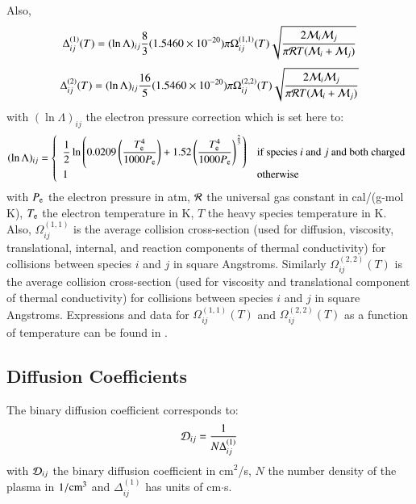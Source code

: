 \documentclass{warpdoc}
\newcommand{\mfd}{\displaystyle}
\begin{document}
Also,
%
\begin{equation}
    \Delta_{ij}^{(1)}(T)=(\ln \Lambda)_{ij}\frac{8}{3} (1.5460 \times 10^{-20}) \pi \Omega_{ij}^{(1,1)}(T) \sqrt{\frac{2 {\cal M}_i {\cal M}_j}{\pi {\cal R} T ({\cal M}_i + {\cal M}_j)} }
\end{equation}
%
%
\begin{equation}
    \Delta_{ij}^{(2)}(T)=(\ln \Lambda)_{ij} \frac{16}{5} (1.5460 \times 10^{-20}) \pi \Omega_{ij}^{(2,2)}(T) \sqrt{\frac{2 {\cal M}_i {\cal M}_j}{\pi {\cal R} T ({\cal M}_i + {\cal M}_j)} }
\end{equation}
%
with $(\ln \Lambda)_{ij}$ the electron pressure correction which is set here to:
%
\begin{equation}
  (\ln \Lambda)_{ij}=\left\{ \begin{array}{ll}\mfd\frac{1}{2} \ln \left( \mfd 0.0209 \left( \frac{T_{\rm e}^4}{1000 P_{\rm e} }\right) + 1.52 \left( \frac{T_{\rm e}^4}{1000 P_{\rm e} }\right)^\frac{2}{3}
  \right)
  & \textrm{if species $i$ and $j$ and both charged}\\
  1 & {\rm otherwise}  
  \end{array}
  \right.
\end{equation}
%
with $P_{\rm e}$ the electron pressure in atm, $\cal R$ the universal gas constant in cal/(g-mol K), $T_{\rm e}$ the electron temperature in K, $T$ the heavy species temperature in K. Also, $\Omega_{ij}^{(1,1)}$ is the average collision cross-section (used for diffusion, viscosity, translational, internal, and reaction components of
thermal conductivity) for collisions between species $i$ and $j$ in square Angstroms. Similarly $\Omega_{ij}^{(2,2)}(T)$ is the average collision cross-section (used for viscosity and translational component of thermal conductivity) for collisions between species $i$ and $j$ in square Angstroms.  Expressions and data for $\Omega_{ij}^{(1,1)}(T)$ and $\Omega_{ij}^{(2,2)}(T)$ as a function of temperature can be found in \cite{nasa:1990:gupta}.

\subsection{Diffusion Coefficients}

The binary diffusion coefficient corresponds to:
%
\begin{equation}
    {\cal D}_{ij}=\frac{1}{N \Delta_{ij}^{(1)}}
\end{equation}
%
with ${\cal D}_{ij}$ the binary diffusion coefficient in cm$^2$/s, $N$ the number density of the plasma in $1/{\rm cm}^3$ and $\Delta_{ij}^{(1)}$ has units of cm$\cdot$s.
\end{document}
